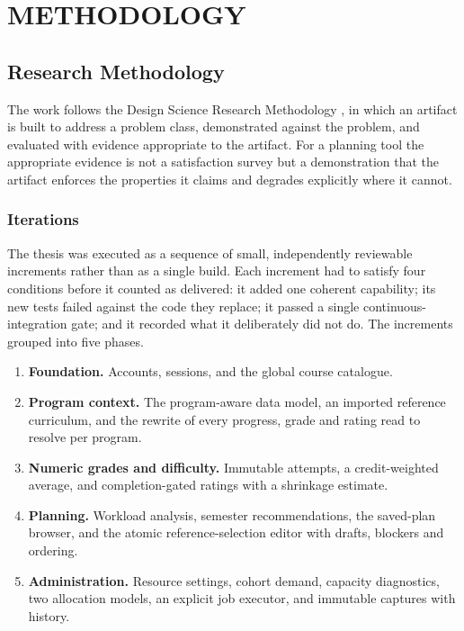 \chapter{METHODOLOGY}

\label{ch:methodology}

\section{Research Methodology}

The work follows the Design Science Research Methodology \cite{hevner2004}, in which an artifact is
built to address a problem class, demonstrated against the problem, and evaluated with evidence
appropriate to the artifact. For a planning tool the appropriate evidence is not a satisfaction
survey but a demonstration that the artifact enforces the properties it claims and degrades
explicitly where it cannot.

\subsection{Iterations}

The thesis was executed as a sequence of small, independently reviewable increments rather than as
a single build. Each increment had to satisfy four conditions before it counted as delivered: it
added one coherent capability; its new tests failed against the code they replace; it passed a
single continuous-integration gate; and it recorded what it deliberately did not do. The
increments grouped into five phases.

\begin{enumerate}
  \item \textbf{Foundation.} Accounts, sessions, and the global course catalogue.
  \item \textbf{Program context.} The program-aware data model, an imported reference curriculum,
        and the rewrite of every progress, grade and rating read to resolve per program.
  \item \textbf{Numeric grades and difficulty.} Immutable attempts, a credit-weighted average, and
        completion-gated ratings with a shrinkage estimate.
  \item \textbf{Planning.} Workload analysis, semester recommendations, the saved-plan browser, and
        the atomic reference-selection editor with drafts, blockers and ordering.
  \item \textbf{Administration.} Resource settings, cohort demand, capacity diagnostics, two
        allocation models, an explicit job executor, and immutable captures with history.
\end{enumerate}

